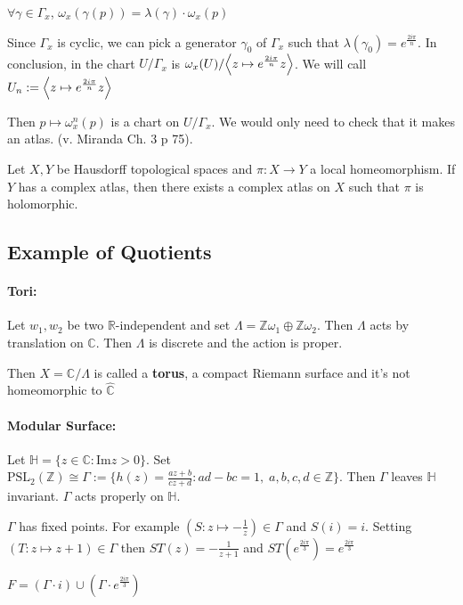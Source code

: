 \begin{proposition}{}
    \(\forall \gamma \in \Gamma_x\), \(\omega_x {(\gamma {(p)})} =
    \lambda{(\gamma)} \cdot \omega_x{(p)}\) 
\end{proposition}

Since \(\Gamma_x\) is cyclic, we can pick a generator \(\gamma_{0}\) of
\(\Gamma_x\) such that \(\lambda{(\gamma_0)} = e^{\frac{2i\pi}{n}}\). In
conclusion, in the chart \(U / \Gamma_x\) is \(\omega_x{(U)} / {\left\langle z \mapsto
e^{\frac{2i\pi}{n}} z\right\rangle} \). We will call \(U_n := {\left\langle z \mapsto
e^{\frac{2i\pi}{n}} z\right\rangle} \) 

Then \(p \mapsto \omega_x^{n}{(p)}\) is a chart on \(U / \Gamma_{x} \). We would
only need to check that it makes an atlas. (v. Miranda Ch. 3 p 75).

\begin{eser}{}
    Let \(X, Y\) be Hausdorff topological spaces and \(\pi : X \to Y\) a local
    homeomorphism. If \(Y\) has a complex atlas, then there exists a complex
    atlas on \(X\) such that \(\pi\) is holomorphic.
\end{eser}


\subsection{Example of Quotients}

\paragraph{Tori:} Let \(w_{1}, w_{2}\) be two \(\mathbb{R}\)-independent
        and set \(\Lambda = \mathbb{Z}\omega_{1} \oplus \mathbb{Z}\omega_{2}\).
        Then \(\Lambda\) acts by translation on \(\mathbb{C}\). Then \(\Lambda\)
        is discrete and the action is proper.

        Then \(X = \mathbb{C} / \Lambda\) is called a \textbf{torus}, a compact
        Riemann surface and it's not homeomorphic to \(\widehat{\mathbb{C}}\) 

\paragraph{Modular Surface:} Let \(\mathbb{H} = \{z \in \mathbb{C} :
        \mathrm{Im} z > 0\} \). Set \(\mathrm{PSL}_2{(\mathbb{Z})} \cong \Gamma
        := \{h{(z)} = \frac{az + b}{cz + d} : ad - bc = 1, \; a,b,c,d \in
        \mathbb{Z}\} \). Then \(\Gamma\) leaves \(\mathbb{H}\) invariant.
        \(\Gamma\) acts properly on \(\mathbb{H}\).

        \(\Gamma\) has fixed points. For example \((S : z \mapsto -\frac{1}{z}) \in
        \Gamma\) and \(S{(i)} = i\). Setting \((T : z \mapsto z+1) \in \Gamma\)
        then \(ST{(z)} = -\frac{1}{z + 1}\) and \(ST{(e^{\frac{2i\pi}{3}})} =
        e^{\frac{2i\pi}{3}}\)


\begin{proposition}{}
    \(F = {\left( \Gamma \cdot i \right)} \cup {\left( \Gamma \cdot
    e^{\frac{2i\pi}{3}} \right)} \) 
\end{proposition}


